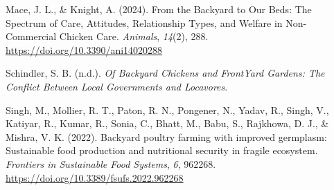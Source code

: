 \documentclass[
  man,
  floatsintext,
  longtable,
  nolmodern,
  notxfonts,
  notimes,
  colorlinks=true,linkcolor=blue,citecolor=blue,urlcolor=blue]{apa7}
\newlength{\cslhangindent}
\newenvironment{CSLReferences}[2] %
 {\begin{list}{}{%
  \setlength{\itemindent}{0pt}
  \setlength{\leftmargin}{0pt}
  \setlength{\parsep}{0pt}
  \ifodd #1
   \setlength{\leftmargin}{\cslhangindent}
   \setlength{\itemindent}{-1\cslhangindent}
  \fi
  \setlength{\itemsep}{#2\baselineskip}}}
 {\end{list}}
\begin{document}
\begin{CSLReferences}{1}{0}
Mace, J. L., \& Knight, A. (2024). From the {Backyard} to {Our Beds}:
{The Spectrum} of {Care}, {Attitudes}, {Relationship Types}, and
{Welfare} in {Non-Commercial Chicken Care}. \emph{Animals},
\emph{14}(2), 288. \url{https://doi.org/10.3390/ani14020288}

Schindler, S. B. (n.d.). \emph{Of {Backyard Chickens} and {FrontYard
Gardens}: {The Conflict Between Local Governments} and {Locavores}}.

Singh, M., Mollier, R. T., Paton, R. N., Pongener, N., Yadav, R., Singh,
V., Katiyar, R., Kumar, R., Sonia, C., Bhatt, M., Babu, S., Rajkhowa, D.
J., \& Mishra, V. K. (2022). Backyard poultry farming with improved
germplasm: {Sustainable} food production and nutritional security in
fragile ecosystem. \emph{Frontiers in Sustainable Food Systems},
\emph{6}, 962268. \url{https://doi.org/10.3389/fsufs.2022.962268}

\end{CSLReferences}
\end{document}
